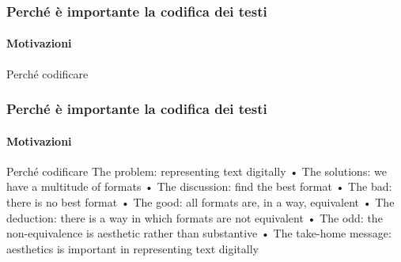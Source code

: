 \begin{frame}
    \frametitle{Perché è importante la codifica dei testi}
    \framesubtitle{Motivazioni}
    \addtocounter{nframe}{1}
    
    \begin{block}{Perché codificare}
   
    \end{block}


\end{frame}

\begin{frame}
    \frametitle{Perché è importante la codifica dei testi}
    \framesubtitle{Motivazioni}
    \addtocounter{nframe}{1}
    
    \begin{block}{Perché codificare}
    The problem: representing text digitally
• The solutions: we have a multitude of formats
• The discussion: find the best format
• The bad: there is no best format
• The good: all formats are, in a way, equivalent
• The deduction: there is a way in which formats
are not equivalent
• The odd: the non-equivalence is aesthetic rather
than substantive
• The take-home message: aesthetics is
important in representing text digitally 
    \end{block}

    

\end{frame}